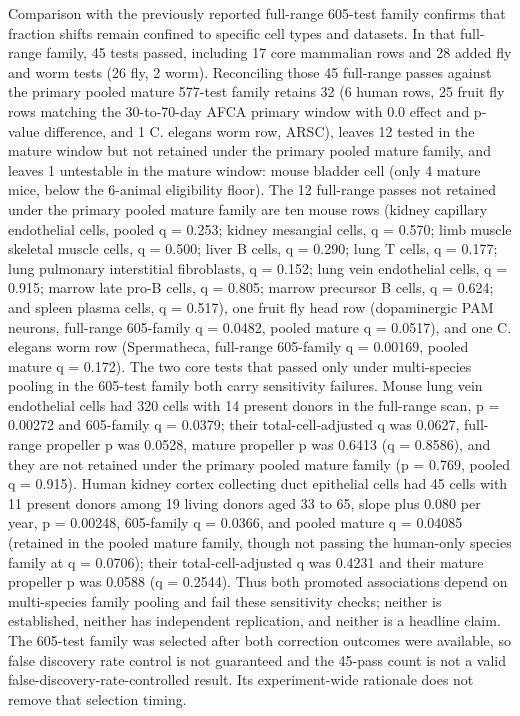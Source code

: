\documentclass[11pt]{article}
\begin{document}
Comparison with the previously reported full-range 605-test family confirms that fraction shifts remain confined to specific cell types and datasets. In that full-range family, 45 tests passed, including 17 core mammalian rows and 28 added fly and worm tests (26 fly, 2 worm). Reconciling those 45 full-range passes against the primary pooled mature 577-test family retains 32 (6 human rows, 25 fruit fly rows matching the 30-to-70-day AFCA primary window with 0.0 effect and p-value difference, and 1 C. elegans worm row, ARSC), leaves 12 tested in the mature window but not retained under the primary pooled mature family, and leaves 1 untestable in the mature window: mouse bladder cell (only 4 mature mice, below the 6-animal eligibility floor). The 12 full-range passes not retained under the primary pooled mature family are ten mouse rows (kidney capillary endothelial cells, pooled q = 0.253; kidney mesangial cells, q = 0.570; limb muscle skeletal muscle cells, q = 0.500; liver B cells, q = 0.290; lung T cells, q = 0.177; lung pulmonary interstitial fibroblasts, q = 0.152; lung vein endothelial cells, q = 0.915; marrow late pro-B cells, q = 0.805; marrow precursor B cells, q = 0.624; and spleen plasma cells, q = 0.517), one fruit fly head row (dopaminergic PAM neurons, full-range 605-family q = 0.0482, pooled mature q = 0.0517), and one C. elegans worm row (Spermatheca, full-range 605-family q = 0.00169, pooled mature q = 0.172). The two core tests that passed only under multi-species pooling in the 605-test family both carry sensitivity failures. Mouse lung vein endothelial cells had 320 cells with 14 present donors in the full-range scan, p = 0.00272 and 605-family q = 0.0379; their total-cell-adjusted q was 0.0627, full-range propeller p was 0.0528, mature propeller p was 0.6413 (q = 0.8586), and they are not retained under the primary pooled mature family (p = 0.769, pooled q = 0.915). Human kidney cortex collecting duct epithelial cells had 45 cells with 11 present donors among 19 living donors aged 33 to 65, slope plus 0.080 per year, p = 0.00248, 605-family q = 0.0366, and pooled mature q = 0.04085 (retained in the pooled mature family, though not passing the human-only species family at q = 0.0706); their total-cell-adjusted q was 0.4231 and their mature propeller p was 0.0588 (q = 0.2544). Thus both promoted associations depend on multi-species family pooling and fail these sensitivity checks; neither is established, neither has independent replication, and neither is a headline claim. The 605-test family was selected after both correction outcomes were available, so false discovery rate control is not guaranteed and the 45-pass count is not a valid false-discovery-rate-controlled result. Its experiment-wide rationale does not remove that selection timing.
\end{document}
